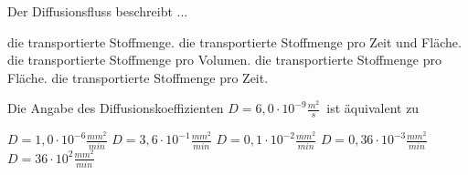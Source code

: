 \documentclass[11pt]{exam}
\begin{document}
\begin{questions}
\vspace{3mm}\question Der Diffusionsfluss beschreibt ...

\begin{choices}
	\choice die transportierte Stoffmenge.
	\choice die transportierte Stoffmenge pro Zeit und Fläche.
	\choice die transportierte Stoffmenge pro Volumen.
	\choice die transportierte Stoffmenge pro Fläche.
	\choice die transportierte Stoffmenge pro Zeit.
\end{choices}

\vspace{3mm}\question Die Angabe des Diffusionskoeffizienten \( D={6,0 \cdot 10^{-9}} \frac{m^2}{s} \) ist äquivalent zu

\begin{choices}
	\choice \( D={1,0 \cdot 10^{-6}} \frac{mm^2}{min} \)
	\choice \( D={3,6 \cdot 10^{-1}} \frac{mm^2}{min} \)
	\choice \( D={0,1 \cdot 10^{-2}} \frac{mm^2}{min} \)
	\choice \( D={0,36 \cdot 10^{-3}} \frac{mm^2}{min} \)
	\choice \( D={36 \cdot 10^{2}} \frac{mm^2}{min} \)
\end{choices}

\vspace{3mm}\end{questions}
\end{document}
